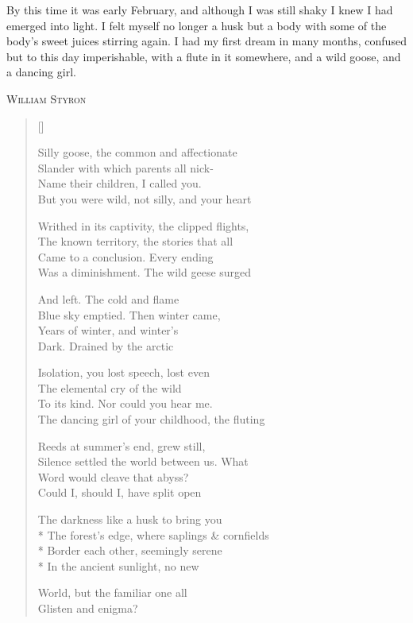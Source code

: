 \label{ch:darknessvisible}
\begingroup
\setlength\epigraphwidth{9cm}
\epigraph{By this time it was early February, and although I was still shaky I knew I had emerged into light. I felt myself no longer a husk but a body with some of the body's sweet juices stirring again. I had my first dream in many months, confused but to this day imperishable, with a flute in it somewhere, and a wild goose, and a dancing girl.}{\textsc{William Styron}}
\endgroup

\settowidth{\versewidth}{The forest's edge, where saplings \& cornfields}
\begin{verse}[\versewidth]

Silly goose, the common and affectionate\\
Slander with which parents all nick-\\
Name their children, I called you.\\
But you were wild, not silly, and your heart

Writhed in its captivity, the clipped flights,\\
The known territory, the stories that all\\
Came to a conclusion. Every ending\\
Was a diminishment. The wild geese surged

And left. The cold and flame\\
Blue sky emptied.  Then winter came,\\
Years of winter, and winter's\\
Dark. Drained by the arctic

Isolation, you lost speech, lost even\\
The elemental cry of the wild\\
To its kind. Nor could you hear me.\\
The dancing girl of your childhood, the fluting

Reeds at summer's end, grew still,\\
Silence settled the world between us. What\\
Word would cleave that abyss?\\
Could I, should I, have split open

The darkness like a husk to bring you\\*
The forest's edge, where saplings \& cornfields\\*
Border each other, seemingly serene\\*
In the ancient sunlight, no new

World, but the familiar one all\\
Glisten and enigma?
\end{verse}
